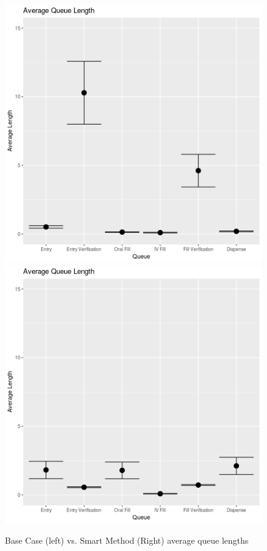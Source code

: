 \documentclass[10pt]{report}            %
\begin{document}
\begin{figure}[H]
\centering
\includegraphics[scale=.35]{BaseQueueCIs.png}
\includegraphics[scale=.35]{SmartQueueCIs.png}
\caption{Base Case (left) vs. Smart Method (Right) average queue lengths}
\label{fig:basevsmart}
\end{figure}
\end{document}

